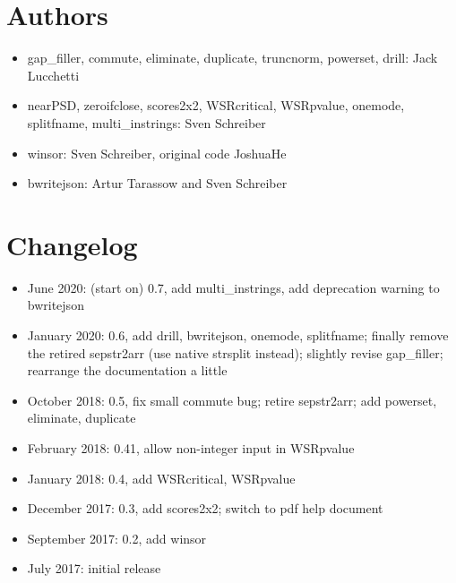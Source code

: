 \documentclass[11pt,english]{article}
\begin{document}
\section{Authors}
\begin{itemize}
\item gap\_filler, commute, eliminate, duplicate, truncnorm, powerset, drill:
 Jack Lucchetti

\item nearPSD, zeroifclose, scores2x2, WSRcritical, WSRpvalue, onemode,
splitfname, multi\_instrings:
Sven Schreiber 

\item winsor: Sven Schreiber, original code JoshuaHe
\item bwritejson: Artur Tarassow and Sven Schreiber

\end{itemize}

\section{Changelog }
\begin{itemize}
\item June 2020: (start on) 0.7, add multi\_instrings, add deprecation warning to 
bwritejson
\item January 2020: 0.6, add drill, bwritejson, onemode, splitfname;
  finally remove the retired sepstr2arr (use native strsplit instead);
  slightly revise gap\_filler; rearrange the documentation a little
\item October 2018: 0.5, fix small commute bug; retire sepstr2arr; add powerset,
  eliminate, duplicate
\item February 2018: 0.41, allow non-integer input in WSRpvalue
\item January 2018: 0.4, add WSRcritical, WSRpvalue
\item December 2017: 0.3, add scores2x2; switch to pdf help document
\item September 2017: 0.2, add winsor 
\item July 2017: initial release
\end{itemize}
\end{document}
